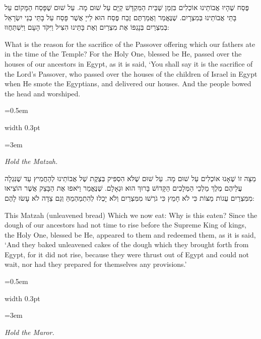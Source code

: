 \documentclass[11pt, openany]{book}
\newcommand{\instruction}[1]{%
  \par\vspace{3pt}
  \begin{tcolorbox}[
    enhanced,
    breakable,
    colback=sederlight,
    colframe=sederlight,
    boxrule=0pt,
    left=10pt,
    right=6pt,
    top=4pt,
    bottom=4pt,
    borderline west={2pt}{0pt}{sederwine!60},
    arc=0pt,
    outer arc=0pt,
  ]
    {\small\itshape\textcolor{sederwine}{#1}}
  \end{tcolorbox}
  \par\vspace{2pt}
}
\newlength{\bidiHebWidth}
\newlength{\bidiEngWidth}
\newenvironment{bilingual}{%
  \par\vspace{4pt}%
}{%
  \noindent
  \begin{minipage}[t]{\bidiEngWidth}
    \setstretch{1.4}\emergencystretch=0.5em\normalsize
    \usebox{\bidiEngBox}
  \end{minipage}%
  \hfill
  {\color{sedergold}\vrule width 0.3pt}%
  \hfill
  \begin{minipage}[t]{\bidiHebWidth}
    \begingroup\hebrewfont\TeXXeTstate=1\beginR
    \large\setstretch{1.4}\emergencystretch=3em\tolerance=9999\parindent=0pt\relax
    \usebox{\bidiHebBox}
    \endR\endgroup
  \end{minipage}%
  \par\vspace{2pt}%
}
\newenvironment{hebrewcol}{%
  \begin{lrbox}{\bidiHebBox}\begin{minipage}{\bidiHebWidth}%
}{%
  \end{minipage}\end{lrbox}%
}
\newenvironment{englishcol}{%
  \begin{lrbox}{\bidiEngBox}\begin{minipage}{\bidiEngWidth}%
}{%
  \end{minipage}\end{lrbox}%
}
\begin{document}
\begin{bilingual}
\begin{hebrewcol}
פֶּסַח שֶׁהָיוּ אֲבוֹתֵינוּ אוֹכְלִים בִּזְמַן שֶׁבֵּית הַמִּקְדָּשׁ קַיָּם עַל שׁוּם מָה. עַל שׁוּם שֶׁפָּסַח הַמָּקוֹם עַל בָּתֵּי אֲבוֹתֵינוּ בְּמִצְרָיִם. שֶׁנֶּאֱמַר וַאֲמַרְתֶּם זֶבַח פֶּסַח הוּא לַייָ אֲשֶׁר פָּסַח עַל בָּתֵּי בְנֵי יִשְׂרָאֵל בְּמִצְרַיִם בְּנָגְפּוֹ אֶת מִצְרַיִם וְאֶת בָּתֵּינוּ הִצִּיל וַיִּקֹּד הָעָם וַיִּשְׁתַּחֲווּ:
\end{hebrewcol}
\begin{englishcol}
What is the reason for the sacrifice of the Passover offering which our fathers ate in the time of the Temple? For the Holy One, blessed be He, passed over the houses of our ancestors in Egypt, as it is said, `You shall say it is the sacrifice of the Lord's Passover, who passed over the houses of the children of Israel in Egypt when He smote the Egyptians, and delivered our houses. And the people bowed the head and worshiped.
\end{englishcol}
\end{bilingual}
\instruction{Hold the Matzah.}

\begin{bilingual}
\begin{hebrewcol}
מַצָּה זוֹ שֶׁאָנוּ אוֹכְלִים עַל שׁוּם מָה. עַל שׁוּם שֶׁלֹּא הִסְפִּיק בְּצֶקֶת שֶׁל אֲבוֹתֵינוּ לְהַחֲמִיץ עַד שֶׁנִּגְלָה עֲלֵיהֶם מֶלֶךְ מַלְכֵי הַמְּלָכִים הַקָּדוֹשׁ בָּרוּךְ הוּא וּגְאָלָם. שֶׁנֶּאֱמַר וַיֹּאפוּ אֶת הַבָּצֵק אֲשֶׁר הוֹצִיאוּ מִמִּצְרַיִם עֻגוֹת מַצּוֹת כִּי לֹא חָמֵץ כִּי גֹרְשׁוּ מִמִּצְרַיִם וְלֹא יָכְלוּ לְהִתְמַהְמֵהַּ וְגַם צֵדָה לֹא עָשׂוּ לָהֶם:
\end{hebrewcol}
\begin{englishcol}
This Matzah (unleavened bread) Which we now eat: Why is this eaten? Since the dough of our ancestors had not time to rise before the Supreme King of kings, the Holy One, blessed be He, appeared to them and redeemed them, as it is said, `And they baked unleavened cakes of the dough which they brought forth from Egypt, for it did not rise, because they were thrust out of Egypt and could not wait, nor had they prepared for themselves any provisions.'
\end{englishcol}
\end{bilingual}
\instruction{Hold the Maror.}
\end{document}
